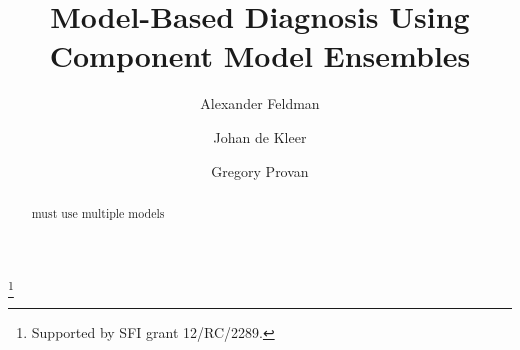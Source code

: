 \documentclass{ifacconf}
\begin{document}
\begin{frontmatter}

\title{Model-Based Diagnosis Using Component Model Ensembles}
\thanks[footnoteinfo]{Supported by SFI grant 12/RC/2289.}
\author[First]{Alexander Feldman}
\author[Second]{Johan de Kleer}
\address[First]{PARC Inc., Palo Alto 94304, California, USA}
\author[Third]{Gregory Provan}
\address[Third]{Department of Computer Science, University College Cork, Cork, Ireland (Tel: 353-21-490-1816; e-mail: g.provan@ cs.ucc.ie).}

\begin{abstract}
must use multiple models
\end{abstract}
\end{frontmatter}








\end{document}
